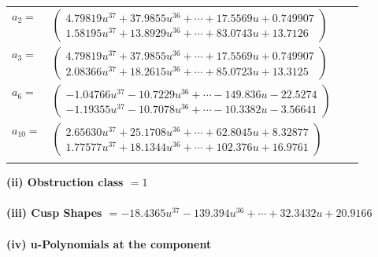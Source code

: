 \documentclass[1p]{elsarticle_modified}
\theoremstyle{definition}
\begin{document}
\begin{tabular}{m{7pt} m{180pt} m{7pt} m{180pt} }
\flushright $a_{2}=$&$\begin{pmatrix}4.79819 u^{37}+37.9855 u^{36}+\cdots+17.5569 u+0.749907\\1.58195 u^{37}+13.8929 u^{36}+\cdots+83.0743 u+13.7126\end{pmatrix}$ \\
\flushright $a_{3}=$&$\begin{pmatrix}4.79819 u^{37}+37.9855 u^{36}+\cdots+17.5569 u+0.749907\\2.08366 u^{37}+18.2615 u^{36}+\cdots+85.0723 u+13.3125\end{pmatrix}$ \\
\flushright $a_{6}=$&$\begin{pmatrix}-1.04766 u^{37}-10.7229 u^{36}+\cdots-149.836 u-22.5274\\-1.19355 u^{37}-10.7078 u^{36}+\cdots-10.3382 u-3.56641\end{pmatrix}$ \\
\flushright $a_{10}=$&$\begin{pmatrix}2.65630 u^{37}+25.1708 u^{36}+\cdots+62.8045 u+8.32877\\1.77577 u^{37}+18.1344 u^{36}+\cdots+102.376 u+16.9761\end{pmatrix}$\\&\end{tabular}
\flushleft \textbf{(ii) Obstruction class $= 1$}\\~\\
\flushleft \textbf{(iii) Cusp Shapes $= -18.4365 u^{37}-139.394 u^{36}+\cdots+32.3432 u+20.9166$}\\~\\
\newpage\renewcommand{\arraystretch}{1}
\flushleft \textbf{(iv) u-Polynomials at the component}\newline \\
\end{document}
